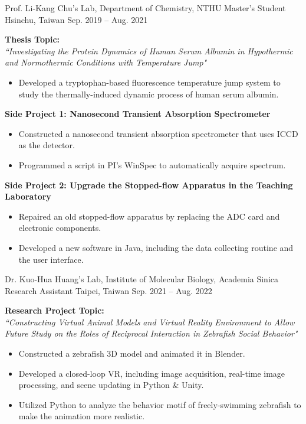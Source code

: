 \begin{cventries}
\cventry
{Prof. Li-Kang Chu's Lab, Department of Chemistry, NTHU}
{Master's Student}
{Hsinchu, Taiwan}
{Sep. 2019 -- Aug. 2021}
{
\begin{minipage}{\textwidth}
\textbf{Thesis Topic:}\\
\textit{``Investigating the Protein Dynamics of Human Serum Albumin in Hypothermic and Normothermic Conditions with Temperature Jump"}
\begin{itemize}
    \item Developed a tryptophan-based fluorescence temperature jump system to study the thermally-induced dynamic process of human serum albumin.
\end{itemize}
\textbf{Side Project 1: Nanosecond Transient Absorption Spectrometer}
\begin{itemize}
    \item Constructed a nanosecond transient absorption spectrometer that uses ICCD as the detector.
    \item Programmed a script in PI's WinSpec to automatically acquire spectrum.
\end{itemize}
\textbf{Side Project 2: Upgrade the Stopped-flow Apparatus in the Teaching Laboratory}
\begin{itemize}
    \item Repaired an old stopped-flow apparatus by replacing the ADC card and electronic components.
    \item Developed a new software in Java, including the data collecting routine and the user interface.
\end{itemize}
\end{minipage}
}

\cventry
{Dr. Kuo-Hua Huang's Lab, Institute of Molecular Biology, Academia Sinica}
{Research Assistant}
{Taipei, Taiwan}
{Sep. 2021 -- Aug. 2022}
{
\begin{minipage}{\textwidth}
\textbf{Research Project Topic:}\\
\textit{``Constructing Virtual Animal Models and Virtual Reality Environment to Allow Future Study on the Roles of Reciprocal Interaction in Zebrafish Social Behavior"}
\begin{itemize}
    \item Constructed a zebrafish 3D model and animated it in Blender.
    \item Developed a closed-loop VR, including image acquisition, real-time image processing, and scene updating in Python \& Unity.
    \item Utilized Python to analyze the behavior motif of freely-swimming zebrafish to make the animation more realistic.
\end{itemize}
\end{minipage}
}
\end{cventries}
